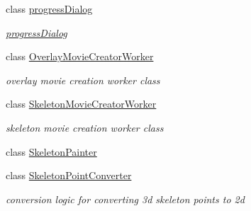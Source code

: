 \begin{DoxyCompactItemize}
class \hyperlink{classUTKinectSkeletonMovementDetector_1_1progressDialog}{progress\-Dialog}
\begin{DoxyCompactList}\small\item\em \hyperlink{classUTKinectSkeletonMovementDetector_1_1progressDialog}{progress\-Dialog} \end{DoxyCompactList}\item 
class \hyperlink{classUTKinectSkeletonMovementDetector_1_1OverlayMovieCreatorWorker}{Overlay\-Movie\-Creator\-Worker}
\begin{DoxyCompactList}\small\item\em overlay movie creation worker class \end{DoxyCompactList}\item 
class \hyperlink{classUTKinectSkeletonMovementDetector_1_1SkeletonMovieCreatorWorker}{Skeleton\-Movie\-Creator\-Worker}
\begin{DoxyCompactList}\small\item\em skeleton movie creation worker class \end{DoxyCompactList}\item 
class \hyperlink{classUTKinectSkeletonMovementDetector_1_1SkeletonPainter}{Skeleton\-Painter}
\item 
class \hyperlink{classUTKinectSkeletonMovementDetector_1_1SkeletonPointConverter}{Skeleton\-Point\-Converter}
\begin{DoxyCompactList}\small\item\em conversion logic for converting 3d skeleton points to 2d \end{DoxyCompactList}\end{DoxyCompactItemize}
